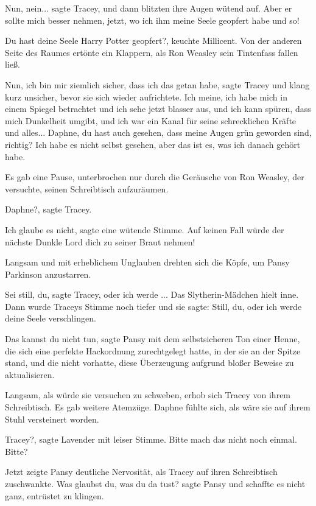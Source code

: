 \glqq{}Nun, nein...\grqq{} sagte Tracey, und dann blitzten ihre Augen wütend auf.
\glqq{}Aber er sollte mich besser nehmen, jetzt, wo ich ihm meine Seele geopfert
habe und so!\grqq{}

\glqq{}Du hast deine Seele Harry Potter geopfert?\grqq{}, keuchte Millicent. Von
der anderen Seite des Raumes ertönte ein Klappern, als Ron Weasley sein
Tintenfass fallen ließ.

\glqq{}Nun, ich bin mir ziemlich sicher, dass ich das getan habe\grqq{}, sagte
Tracey und klang kurz unsicher, bevor sie sich wieder aufrichtete. \glqq{}Ich
meine, ich habe mich in einem Spiegel betrachtet und ich sehe jetzt blasser aus,
und ich kann spüren, dass mich Dunkelheit umgibt, und ich war ein Kanal für
seine schrecklichen Kräfte und alles... Daphne, du hast auch gesehen, dass meine
Augen grün geworden sind, richtig? Ich habe es nicht selbst gesehen, aber das
ist es, was ich danach gehört habe.\grqq{}

Es gab eine Pause, unterbrochen nur durch die Geräusche von Ron Weasley, der
versuchte, seinen Schreibtisch aufzuräumen.

\glqq{}Daphne?\grqq{}, sagte Tracey.

\glqq{}Ich glaube es nicht\grqq{}, sagte eine wütende Stimme. \glqq{}Auf keinen
Fall würde der nächste Dunkle Lord dich zu seiner Braut nehmen!\grqq{}

Langsam und mit erheblichem Unglauben drehten sich die Köpfe, um Pansy Parkinson
anzustarren.

\glqq{}Sei still, du\grqq{}, sagte Tracey, \glqq{}oder ich werde ...\grqq{} Das
Slytherin-Mädchen hielt inne. Dann wurde Traceys Stimme noch tiefer und sie
sagte: \glqq{}Still, du, oder ich werde deine Seele verschlingen.\grqq{}

\glqq{}Das kannst du nicht tun\grqq{}, sagte Pansy mit dem selbstsicheren Ton
einer Henne, die sich eine perfekte Hackordnung zurechtgelegt hatte, in der sie
an der Spitze stand, und die nicht vorhatte, diese Überzeugung aufgrund bloßer
Beweise zu aktualisieren.

Langsam, als würde sie versuchen zu schweben, erhob sich Tracey von ihrem
Schreibtisch. Es gab weitere Atemzüge. Daphne fühlte sich, als wäre sie auf
ihrem Stuhl versteinert worden.

\glqq{}Tracey?\grqq{}, sagte Lavender mit leiser Stimme. \glqq{}Bitte mach das
nicht noch einmal. Bitte?\grqq{}

Jetzt zeigte Pansy deutliche Nervosität, als Tracey auf ihren Schreibtisch
zuschwankte. \glqq{}Was glaubst du, was du da tust?\grqq{} sagte Pansy und
schaffte es nicht ganz, entrüstet zu klingen.

